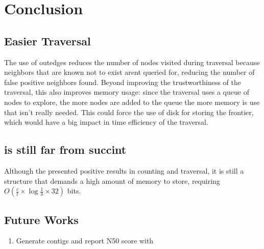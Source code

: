 \chapter{Conclusion}

\section{Easier Traversal}

The use of outedges reduces the number of nodes visited during traversal because neighbors that are known not to exist arent queried for, reducing the number of false positive neighbors found. Beyond improving the trustworthiness of the traversal, this also improves memory usage: since the traversal uses a queue of nodes to explore, the more nodes are added to the queue the more memory is use that isn't really needed. This could force the use of disk for storing the frontier, which would have a big impact in time efficiency of the traversal.

\section{\dBCM is still far from succint}

Although the \dBCM presented positive results in counting and traversal, it is still a structure that demands a high amount of memory to store, requiring $O(\frac{c}{t} \times \log \frac{1}{\delta} \times 32)$ bits.

\section{Future Works}

\begin{enumerate}
\item Generate contigs and report N50 score with \dBHT
\end{enumerate}